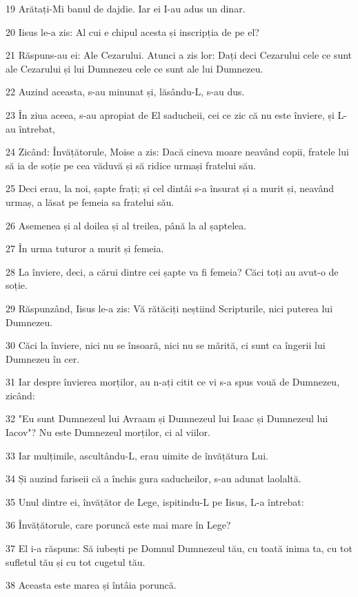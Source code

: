 \par 19 Arătați-Mi banul de dajdie. Iar ei I-au adus un dinar.
\par 20 Iisus le-a zis: Al cui e chipul acesta și inscripția de pe el?
\par 21 Răspuns-au ei: Ale Cezarului. Atunci a zis lor: Dați deci Cezarului cele ce sunt ale Cezarului și lui Dumnezeu cele ce sunt ale lui Dumnezeu.
\par 22 Auzind aceasta, s-au minunat și, lăsându-L, s-au dus.
\par 23 În ziua aceea, s-au apropiat de El saducheii, cei ce zic că nu este înviere, și L-au întrebat,
\par 24 Zicând: Învățătorule, Moise a zis: Dacă cineva moare neavând copii, fratele lui să ia de soție pe cea văduvă și să ridice urmași fratelui său.
\par 25 Deci erau, la noi, șapte frați; și cel dintâi s-a însurat și a murit și, neavând urmaș, a lăsat pe femeia sa fratelui său.
\par 26 Asemenea și al doilea și al treilea, până la al șaptelea.
\par 27 În urma tuturor a murit și femeia.
\par 28 La înviere, deci, a cărui dintre cei șapte va fi femeia? Căci toți au avut-o de soție.
\par 29 Răspunzând, Iisus le-a zis: Vă rătăciți neștiind Scripturile, nici puterea lui Dumnezeu.
\par 30 Căci la înviere, nici nu se însoară, nici nu se mărită, ci sunt ca îngerii lui Dumnezeu în cer.
\par 31 Iar despre învierea morților, au n-ați citit ce vi s-a spus vouă de Dumnezeu, zicând:
\par 32 "Eu sunt Dumnezeul lui Avraam și Dumnezeul lui Isaac și Dumnezeul lui Iacov"? Nu este Dumnezeul morților, ci al viilor.
\par 33 Iar mulțimile, ascultându-L, erau uimite de învățătura Lui.
\par 34 Și auzind fariseii că a închis gura saducheilor, s-au adunat laolaltă.
\par 35 Unul dintre ei, învățător de Lege, ispitindu-L pe Iisus, L-a întrebat:
\par 36 Învățătorule, care poruncă este mai mare în Lege?
\par 37 El i-a răspuns: Să iubești pe Domnul Dumnezeul tău, cu toată inima ta, cu tot sufletul tău și cu tot cugetul tău.
\par 38 Aceasta este marea și întâia poruncă.
